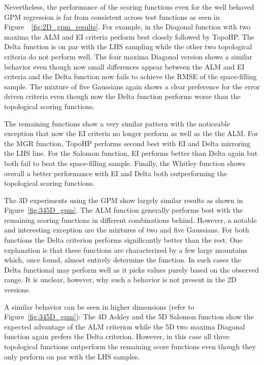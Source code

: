 Nevertheless, the performance of the scoring functions even for the well behaved GPM regression is far from consistent across test functions as seen in Figure~~\ref{fig:2D_gpm_results}.
%
For example, in the Diagonal function with two maxima the ALM and EI criteria perform best closely followed by TopoHP.
%
The Delta function is on par with the LHS sampling while the other two topological criteria do not perform well.
%
The four maxima Diagonal version shows a similar behavior even though now small differences appear between the ALM and EI criteria and the Delta function now fails to achieve the RMSE of the space-filling sample.
%
The mixture of five Gaussians again shows a clear preference for the error driven criteria even though now the Delta function performs worse than the topological scoring functions.

The remaining functions show a very similar pattern with the noticeable exception that now the EI criteria no longer perform as well as the the ALM.
%
For the MGR function, TopoHP performs second best with EI and Delta mirroring the LHS line.
%
For the Salomon function, EI performs better than Delta again but both fail to beat the space-filling sample.
%
Finally, the Whitley function shows overall a better performance with EI and Delta both outperforming the topological scoring functions.

The 3D experiments using the GPM show largely similar results as shown in
Figure~\ref{fig:345D_gpm}.
%
The ALM function generally performs best with the remaining scoring functions in different combinations behind.
%
However, a notable and interesting exception are the mixtures of two and five Gaussians.
%
For both functions the Delta criterion performs significantly better than the rest.
%
One explanation is that these functions are characterized by a few large mountains
which, once found, almost entirely determine the function.
%
In such cases the Delta functional may perform well as it picks values purely based on the observed range.
%
It is unclear, however, why such a behavior is not present in the 2D versions.

A similar behavior can be seen in higher dimensions (refer to Figure~\ref{fig:345D_gpm}): The 4D Ackley and the 5D Salomon function show the expected advantage of the ALM criterion while the 5D two maxima Diagonal
function again prefers the Delta criterion.
%
However, in this case all three topological functions outperform the remaining score functions even though they only perform on par with the LHS samples.

